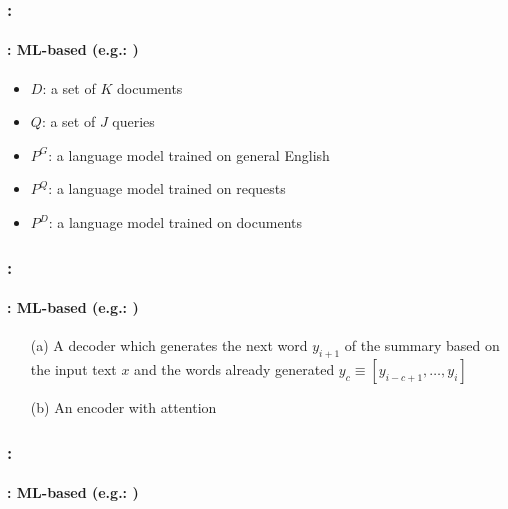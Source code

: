 \documentclass[xcolor=table]{beamer}
\begin{document}
\begin{frame}
	\frametitle{\insertshortsubtitle: \insertsection}
	\framesubtitle{\insertsubsection: ML-based (e.g.: \cite{06-daumeiii-marcu})}
	
	\begin{minipage}{.6\textwidth}
		\begin{itemize}
			\item $D$: a set of $K$ documents
			\item $Q$: a set of $J$ queries
			\item $P^G$: a language model trained on general English 
			\item $P^Q$: a language model trained on requests
			\item $P^D$: a language model trained on documents
		\end{itemize}
	\end{minipage}
	\begin{minipage}{.38\textwidth}
	\end{minipage}
	
\end{frame}

\begin{frame}
	\frametitle{\insertshortsubtitle: \insertsection}
	\framesubtitle{\insertsubsection: ML-based (e.g.: \cite{15-rush-al})}
	
	\begin{center}
	\end{center}
	
	\begin{itemize}
		\item[(a)] A decoder which generates the next word $y_{i+1}$ of the summary based on the input text $x$ and the words already generated $y_c \equiv [y_{i-c+1},\ldots, y_i]$
		\item[(b)] An encoder with attention
	\end{itemize}
	
\end{frame}

\begin{frame}
	\frametitle{\insertshortsubtitle: \insertsection}
	\framesubtitle{\insertsubsection: ML-based (e.g.: \cite{18-narayan-al})}
	
	
\end{frame}
\end{document}
